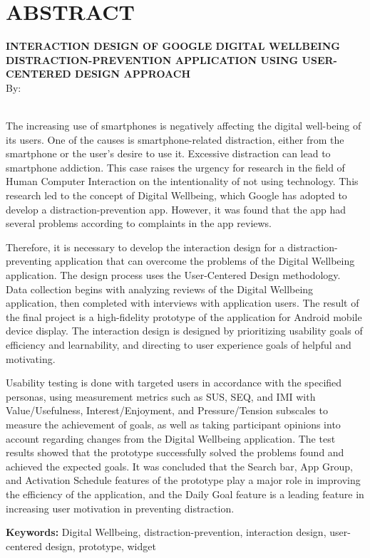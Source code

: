 \clearpage
\chapter*{ABSTRACT}

\begin{center}
  \textbf{\MakeUppercase{Interaction Design of Google Digital Wellbeing Distraction-Prevention Application using User-Centered Design Approach}} \\[1em]
  
  By: \\
  \MakeUppercase{\theauthor} \\

\end{center}

\begin{singlespace}
  The increasing use of smartphones is negatively affecting the digital well-being of its users. One of the causes is smartphone-related distraction, either from the smartphone or the user's desire to use it. Excessive distraction can lead to smartphone addiction. This case raises the urgency for research in the field of Human Computer Interaction on the intentionality of not using technology. This research led to the concept of Digital Wellbeing, which Google has adopted to develop a distraction-prevention app. However, it was found that the app had several problems according to complaints in the app reviews.

  Therefore, it is necessary to develop the interaction design for a distraction-preventing application that can overcome the problems of the Digital Wellbeing application. The design process uses the User-Centered Design methodology. Data collection begins with analyzing reviews of the Digital Wellbeing application, then completed with interviews with application users. The result of the final project is a high-fidelity prototype of the application for Android mobile device display. The interaction design is designed by prioritizing usability goals of efficiency and learnability, and directing to user experience goals of helpful and motivating.

  Usability testing is done with targeted users in accordance with the specified personas, using measurement metrics such as SUS, SEQ, and IMI with Value/Usefulness, Interest/Enjoyment, and Pressure/Tension subscales to measure the achievement of goals, as well as taking participant opinions into account regarding changes from the Digital Wellbeing application. The test results showed that the prototype successfully solved the problems found and achieved the expected goals. It was concluded that the Search bar, App Group, and Activation Schedule features of the prototype play a major role in improving the efficiency of the application, and the Daily Goal feature is a leading feature in increasing user motivation in preventing distraction.

  \noindent \textbf{Keywords:} Digital Wellbeing, distraction-prevention, interaction design, user-centered design, prototype, widget

\end{singlespace}
